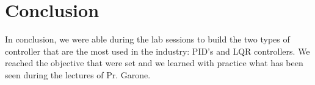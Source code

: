 \setcounter{secnumdepth}{-1}

\chapter{Conclusion}

In conclusion, we were able during the lab sessions to build the two types of controller that are the most used in the industry: PID's and LQR controllers. We reached the objective that were set and we learned with practice what has been seen during the lectures of Pr. Garone.
